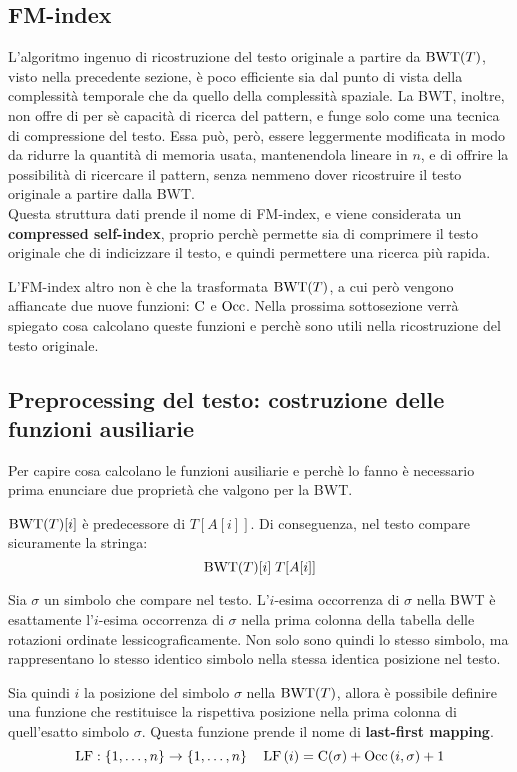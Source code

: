 \subsection{FM-index}
L'algoritmo ingenuo di ricostruzione del testo originale a partire da $\textnormal{BWT}(T)$,
visto nella precedente sezione, è poco efficiente sia dal punto di vista della
complessità temporale che da quello della complessità spaziale.
La BWT, inoltre, non offre di per sè capacità di ricerca del pattern,
e funge solo come una tecnica di compressione del testo.
Essa può, però, essere leggermente modificata in modo da
ridurre la quantità di memoria usata,
mantenendola lineare in $n$, e di offrire la possibilità
di ricercare il pattern, senza nemmeno dover ricostruire il testo originale
a partire dalla BWT.\\
Questa struttura dati prende il nome di FM-index, e viene
considerata un \textbf{compressed self-index}, proprio perchè permette sia di
comprimere il testo originale che di indicizzare il testo, e quindi permettere
una ricerca più rapida.

L'FM-index altro non è che la trasformata $\textnormal{BWT}(T)$, a cui però vengono
affiancate due nuove funzioni: $\textnormal{C}$ e $\textnormal{Occ}$.
Nella prossima sottosezione verrà spiegato cosa calcolano queste funzioni e
perchè sono utili nella ricostruzione del testo originale.

\subsection*{Preprocessing del testo: costruzione delle funzioni ausiliarie}
Per capire cosa calcolano le funzioni ausiliarie e perchè lo fanno è necessario
prima enunciare due proprietà che valgono per la BWT.\\
\begin{property}
    $\textnormal{BWT}(T)[i]$ è predecessore di $T[A[i]]$. Di conseguenza, nel testo compare
    sicuramente la stringa:
    \[
        \textnormal{BWT}(T)[i] \; T[A[i]]
    \]
\end{property}
\begin{property}
    Sia $\sigma$ un simbolo che compare nel testo.
    L'$i$-esima occorrenza di $\sigma$ nella BWT è esattamente l'$i$-esima
    occorrenza di $\sigma$ nella prima colonna della tabella delle rotazioni
    ordinate lessicograficamente.
    Non solo sono quindi lo stesso simbolo, ma rappresentano lo stesso identico
    simbolo nella stessa identica posizione nel testo.
\end{property}
Sia quindi $i$ la posizione del simbolo $\sigma$ nella $\textnormal{BWT}(T)$, allora è
possibile definire una funzione che restituisce la rispettiva posizione nella
prima colonna di quell'esatto simbolo $\sigma$. Questa funzione prende il nome
di \textbf{last-first mapping}.
\[
    \textnormal{LF}: \left\{1, \ldots, n\right\} \rightarrow \left\{1, \ldots, n\right\} \quad
    \textnormal{LF} \left(i\right) = \textnormal{C}(\sigma) + \textnormal{Occ} \left(i, \sigma\right) + 1
\]

